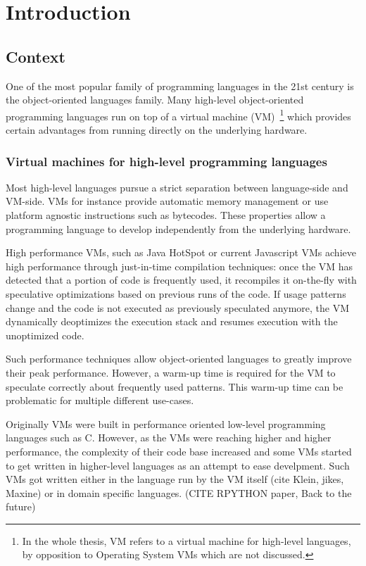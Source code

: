 \documentclass[a4paper,12pt,twoside]{../includes/ThesisStyle}
\begin{document}
\fi

\chapter{Introduction}
\label{chap:intro}
\minitoc

\section{Context}

One of the most popular family of programming languages in the 21st century is the object-oriented languages family. Many high-level object-oriented programming languages run on top of a virtual machine (VM)~\footnote{In the whole thesis, VM refers to a virtual machine for high-level languages, by opposition to Operating System VMs which are not discussed.} which provides certain advantages from running directly on the underlying hardware. 

\subsection{Virtual machines for high-level programming languages}

Most high-level languages pursue a strict separation between language-side and VM-side. VMs for instance provide automatic memory management or use platform agnostic instructions such as bytecodes. These properties allow a programming language to develop independently from the underlying hardware.

High performance VMs, such as Java HotSpot or current Javascript VMs achieve high performance through just-in-time compilation techniques: once the VM has detected that a portion of code is frequently used, it recompiles it on-the-fly with speculative optimizations based on previous runs of the code. If usage patterns change and the code is not executed as previously speculated anymore, the VM dynamically deoptimizes the execution stack and resumes execution with the unoptimized code.

Such performance techniques allow object-oriented languages to greatly improve their peak performance. However, a warm-up time is required for the VM to speculate correctly about frequently used patterns. This warm-up time can be problematic for multiple different use-cases.

Originally VMs were built in performance oriented low-level programming languages such as C. However, as the VMs were reaching higher and higher performance, the complexity of their code base increased and some VMs started to get written in higher-level languages as an attempt to ease develpment. Such VMs got written either in the language run by the VM itself (cite Klein, jikes, Maxine) or in domain specific languages. (CITE RPYTHON paper, Back to the future)
\end{document}
